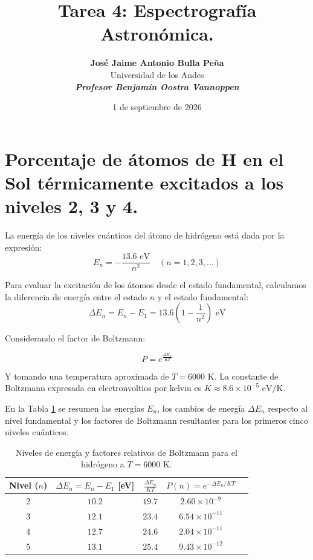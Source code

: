 \documentclass[11pt,a4paper]{article}
\title{\textbf{\Large Tarea 4: Espectrografía Astronómica.}\\}
\author{\textbf{José Jaime Antonio Bulla Peña} \\ Universidad de los Andes \\ \textit{\textbf{Profesor Benjamín Oostra Vannoppen}}}
\date{1 de septiembre de 2026}
\begin{document}
\maketitle



\section*{Porcentaje de átomos de H en el Sol
térmicamente excitados a los niveles 2, 3 y 4.}


La energía de los niveles cuánticos del átomo de hidrógeno está dada por la expresión:
\begin{equation}
    E_n = -\frac{13.6 \text{ eV}}{n^2} \quad (n = 1, 2, 3, \dots)
\end{equation}

Para evaluar la excitación de los átomos desde el estado fundamental, calculamos la diferencia de energía entre el estado $n$ y el estado fundamental:
\begin{equation}
    \Delta E_n = E_n - E_1 = 13.6 \left( 1 - \frac{1}{n^2} \right) \text{ eV}
\end{equation}

Considerando el factor de Boltzmann:

\begin{equation}
    P = e^{\frac{\Delta E_n}{KT}}
\end{equation}

Y tomando una temperatura aproximada de $T = 6000\text{ K}$. La constante de Boltzmann expresada en electronvoltios por kelvin es $K \approx 8.6 \times 10^{-5}\text{ eV/K}$.

En la Tabla \ref{tab:hidrogeno} se resumen las energías $E_n$, los cambios de energía $\Delta E_n$ respecto al nivel fundamental y los factores de Boltzmann resultantes para los primeros cinco niveles cuánticos.

\begin{table}[h!]
\centering
\caption{Niveles de energía y factores relativos de Boltzmann para el hidrógeno a $T = 6000\text{ K}$.}
\label{tab:hidrogeno}
\begin{tabular}{ccccc}
\toprule
\textbf{Nivel ($n$)} & \textbf{$\Delta E_n = E_n - E_1$ [eV]} & \textbf{$\frac{\Delta E_n}{KT}$} & \textbf{$P(n) = e^{-\Delta E_n / KT}$} \\ \midrule

2  & $10.2$ & $19.7$ & $2.60 \times 10^{-9}$  \\
3 & $12.1$ & $23.4$ & $6.54 \times 10^{-11}$ \\
4 & $12.7$ & $24.6$ & $2.04 \times 10^{-11}$ \\
5 & $13.1$ & $25.4$ & $9.43 \times 10^{-12}$ \\ \bottomrule
\end{tabular}
\end{table}
\end{document}
